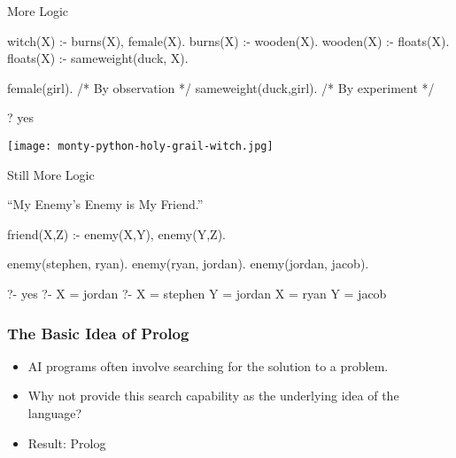 \documentclass{plt}
\begin{document}
\fi

\begin{frame}[fragile]{More Logic}

\begin{prolog}
witch(X)  :- burns(X), female(X).
burns(X)  :- wooden(X).
wooden(X) :- floats(X).
floats(X) :- sameweight(duck, X).

female(girl).          /* By observation */
sameweight(duck,girl). /* By experiment */
\end{prolog}

\begin{interactive}
? 
yes
\end{interactive}

\hfill
\texttt{[image: monty-python-holy-grail-witch.jpg]}

\end{frame}

\begin{frame}[fragile]{Still More Logic}

``My Enemy's Enemy is My Friend.''

\footnotesize

\begin{minipage}{0.5\textwidth}
\begin{prolog}
friend(X,Z) :-
   enemy(X,Y), enemy(Y,Z).

enemy(stephen, ryan).
enemy(ryan, jordan).
enemy(jordan, jacob).
\end{prolog}
\end{minipage}
\begin{minipage}{0.45\textwidth}
\begin{interactive}
?- 
yes
?- 
X = jordan
?- 
X = stephen Y = jordan
X = ryan Y = jacob
\end{interactive}
\end{minipage}

\end{frame}

\begin{frame}
  \frametitle{The Basic Idea of Prolog}

\begin{itemize}

\item AI programs often involve searching for the solution to a problem.

\item Why not provide this search capability as the underlying idea of
the language?

\item Result: Prolog

\end{itemize}

\end{frame}
\end{document}
